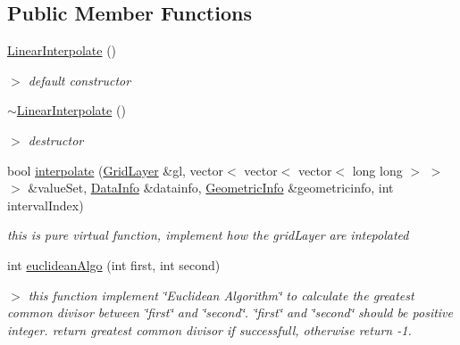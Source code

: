 \subsection*{\-Public \-Member \-Functions}
\begin{DoxyCompactItemize}
\item 
\hypertarget{classLinearInterpolate_a4a9fc4c8716102768917160b45f72aa1}{\hyperlink{classLinearInterpolate_a4a9fc4c8716102768917160b45f72aa1}{\-Linear\-Interpolate} ()}\label{classLinearInterpolate_a4a9fc4c8716102768917160b45f72aa1}

\begin{DoxyCompactList}\small\item\em $>$ default constructor \end{DoxyCompactList}\item 
\hypertarget{classLinearInterpolate_a1d356429366039d290d822268121a605}{\hyperlink{classLinearInterpolate_a1d356429366039d290d822268121a605}{$\sim$\-Linear\-Interpolate} ()}\label{classLinearInterpolate_a1d356429366039d290d822268121a605}

\begin{DoxyCompactList}\small\item\em $>$ destructor \end{DoxyCompactList}\item 
bool \hyperlink{classLinearInterpolate_a1fbd904450c76999f393649026dfbd7f}{interpolate} (\hyperlink{classGridLayer}{\-Grid\-Layer} \&gl, vector$<$ vector$<$ vector$<$ long long $>$ $>$ $>$ \&value\-Set, \hyperlink{structDataInfo}{\-Data\-Info} \&datainfo, \hyperlink{structGeometricInfo}{\-Geometric\-Info} \&geometricinfo, int interval\-Index)
\begin{DoxyCompactList}\small\item\em this is pure virtual function, implement how the grid\-Layer are intepolated \end{DoxyCompactList}\item 
\hypertarget{classLinearInterpolate_ae390e31d42da1e6c8658df3cb0c9c85b}{int \hyperlink{classLinearInterpolate_ae390e31d42da1e6c8658df3cb0c9c85b}{euclidean\-Algo} (int first, int second)}\label{classLinearInterpolate_ae390e31d42da1e6c8658df3cb0c9c85b}

\begin{DoxyCompactList}\small\item\em $>$ this function implement \char`\"{}\-Euclidean Algorithm\char`\"{} to calculate the greatest common divisor between \char`\"{}first\char`\"{} and \char`\"{}second\char`\"{}. \char`\"{}first\char`\"{} and \char`\"{}second\char`\"{} should be positive integer. return greatest common divisor if successfull, otherwise return -\/1. \end{DoxyCompactList}\end{DoxyCompactItemize}


